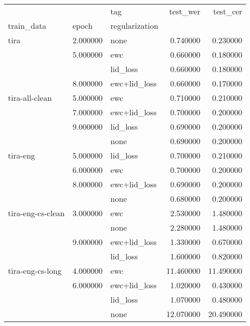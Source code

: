 \begin{tabular}{lllrr}
\toprule
 &  & tag & test_wer & test_cer \\
train_data & epoch & regularization &  &  \\
\midrule
tira & 2.000000 & none & 0.740000 & 0.230000 \\
 & 5.000000 & ewc & 0.660000 & 0.180000 \\
 &  & lid_loss & 0.660000 & 0.180000 \\
 & 8.000000 & ewc+lid_loss & 0.660000 & 0.170000 \\
tira-all-clean & 5.000000 & ewc & 0.710000 & 0.210000 \\
 & 7.000000 & ewc+lid_loss & 0.700000 & 0.200000 \\
 & 9.000000 & lid_loss & 0.690000 & 0.200000 \\
 &  & none & 0.690000 & 0.200000 \\
tira-eng & 5.000000 & lid_loss & 0.700000 & 0.210000 \\
 & 6.000000 & ewc & 0.700000 & 0.200000 \\
 & 8.000000 & ewc+lid_loss & 0.690000 & 0.200000 \\
 &  & none & 0.680000 & 0.200000 \\
tira-eng-cs-clean & 3.000000 & ewc & 2.530000 & 1.480000 \\
 &  & none & 2.280000 & 1.480000 \\
 & 9.000000 & ewc+lid_loss & 1.330000 & 0.670000 \\
 &  & lid_loss & 1.600000 & 0.820000 \\
tira-eng-cs-long & 4.000000 & ewc & 11.460000 & 11.490000 \\
 & 6.000000 & ewc+lid_loss & 1.020000 & 0.430000 \\
 &  & lid_loss & 1.070000 & 0.480000 \\
 &  & none & 12.070000 & 20.490000 \\
\bottomrule
\end{tabular}
